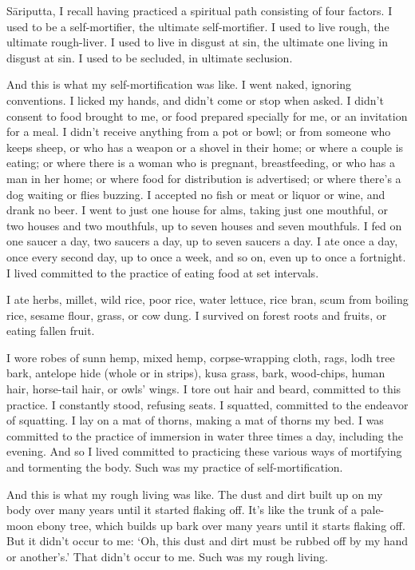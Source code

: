 \documentclass[12pt,openany]{book}%
\begin{document}
\textsanskrit{Sāriputta}, I recall having practiced a spiritual path consisting of four factors. I used to be a self-mortifier, the ultimate self-mortifier. I used to live rough, the ultimate rough-liver. I used to live in disgust at sin, the ultimate one living in disgust at sin. I used to be secluded, in ultimate seclusion. 

And this is what my self-mortification was like. I went naked, ignoring conventions. I licked my hands, and didn’t come or stop when asked. I didn’t consent to food brought to me, or food prepared specially for me, or an invitation for a meal. I didn’t receive anything from a pot or bowl; or from someone who keeps sheep, or who has a weapon or a shovel in their home; or where a couple is eating; or where there is a woman who is pregnant, breastfeeding, or who has a man in her home; or where food for distribution is advertised; or where there’s a dog waiting or flies buzzing. I accepted no fish or meat or liquor or wine, and drank no beer. I went to just one house for alms, taking just one mouthful, or two houses and two mouthfuls, up to seven houses and seven mouthfuls. I fed on one saucer a day, two saucers a day, up to seven saucers a day. I ate once a day, once every second day, up to once a week, and so on, even up to once a fortnight. I lived committed to the practice of eating food at set intervals. 

I ate herbs, millet, wild rice, poor rice, water lettuce, rice bran, scum from boiling rice, sesame flour, grass, or cow dung. I survived on forest roots and fruits, or eating fallen fruit. 

I wore robes of sunn hemp, mixed hemp, corpse-wrapping cloth, rags, lodh tree bark, antelope hide (whole or in strips), kusa grass, bark, wood-chips, human hair, horse-tail hair, or owls’ wings. I tore out hair and beard, committed to this practice. I constantly stood, refusing seats. I squatted, committed to the endeavor of squatting. I lay on a mat of thorns, making a mat of thorns my bed. I was committed to the practice of immersion in water three times a day, including the evening. And so I lived committed to practicing these various ways of mortifying and tormenting the body. Such was my practice of self-mortification. 

And this is what my rough living was like. The dust and dirt built up on my body over many years until it started flaking off. It’s like the trunk of a pale-moon ebony tree, which builds up bark over many years until it starts flaking off. But it didn’t occur to me: ‘Oh, this dust and dirt must be rubbed off by my hand or another’s.’ That didn’t occur to me. Such was my rough living. 
\end{document}

